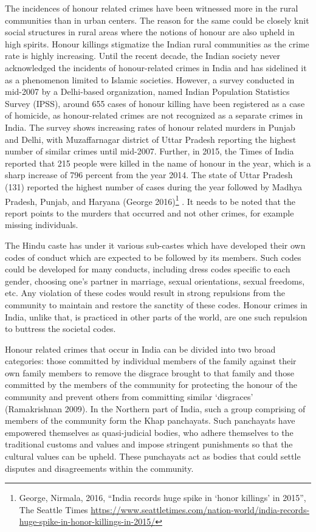 \begin{multicols}{2}
\noi
The incidences of honour related crimes have been witnessed more in the rural
communities than in urban centers. The reason for the same could be closely knit social
structures in rural areas where the notions of honour are also upheld in high spirits.
Honour killings stigmatize the Indian rural communities as the crime rate is highly
increasing. Until the recent decade, the Indian society never acknowledged the incidents
of honour-related crimes in India and has sidelined it as a phenomenon limited to
Islamic societies. However, a survey conducted in mid-2007 by a Delhi-based
organization, named Indian Population Statistics Survey (IPSS), around 655 cases of
honour killing have been registered as a case of homicide, as honour-related crimes are
not recognized as a separate crimes in India. The survey shows increasing rates of
honour related murders in Punjab and Delhi, with Muzaffarnagar district of Uttar
Pradesh reporting the highest number of similar crimes until mid-2007. Further, in
2015, the Times of India reported that 215 people were killed in the name of honour in
the year, which is a sharp increase of 796 percent from the year 2014. The state of Uttar
Pradesh (131) reported the highest number of cases during the year followed by Madhya
Pradesh, Punjab, and Haryana (George 2016)\footnote{George, Nirmala, 2016, “India records huge spike in ‘honor killings’ in 2015”, The Seattle Times
\url{https://www.seattletimes.com/nation-world/india-records-huge-spike-in-honor-killings-in-2015/}}
. It needs to be noted that the report points
to the murders that occurred and not other crimes, for example missing individuals.


\noi
The Hindu caste has under it various sub-castes which have developed their own codes
of conduct which are expected to be followed by its members. Such codes could be
developed for many conducts, including dress codes specific to each gender, choosing
one's partner in marriage, sexual orientations, sexual freedoms, etc. Any violation of
these codes would result in strong repulsions from the community to maintain and
restore the sanctity of these codes. Honour crimes in India, unlike that, is practiced in
other parts of the world, are one such repulsion to buttress the societal codes. 

\noi
Honour related crimes that occur in India can be divided into two broad categories:
those committed by individual members of the family against their own family members to remove the disgrace brought to that family and those committed by the
members of the community for protecting the honour of the community and prevent
others from committing similar ‘disgraces’ (Ramakrishnan 2009). In the Northern part
of India, such a group comprising of members of the community form the Khap
panchayats. Such panchayats have empowered themselves as quasi-judicial bodies,
who adhere themselves to the traditional customs and values and impose stringent
punishments so that the cultural values can be upheld. These punchayats act as bodies
that could settle disputes and disagreements within the community.


\end{multicols}
